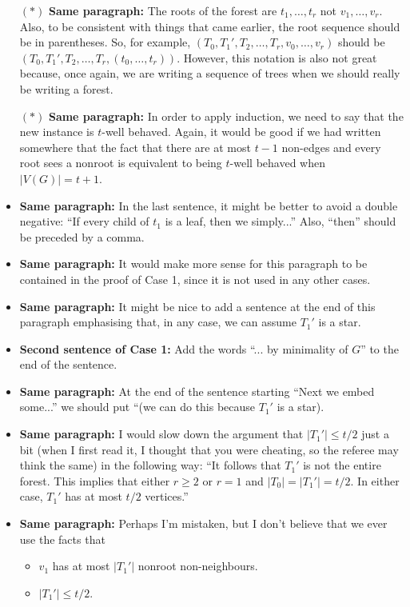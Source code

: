 \documentclass[11 pt]{article}
\begin{document}
\begin{itemize}
\item[$\boldsymbol{(*)}$] \textbf{Same paragraph:} The roots of the forest are $t_1,\dots,t_r$ not $v_1,\dots,v_r$. Also, to be consistent with things that came earlier, the root sequence should be in parentheses. So, for example, $(T_0,T_1',T_2,\dots,T_r,v_0,\dots,v_r)$ should be $(T_0,T_1',T_2,\dots,T_r,(t_0,\dots,t_r))$. However, this notation is also not great because, once again, we are writing a sequence of trees when we should really be writing a forest. 
\item[$\boldsymbol{(*)}$] \textbf{Same paragraph:} In order to apply induction, we need to say that the new instance is $t$-well behaved. Again, it would be good if we had written somewhere that the fact that there are at most $t-1$ non-edges and every root sees a nonroot is equivalent to being $t$-well behaved when $|V(G)|=t+1$. 
\item \textbf{Same paragraph:} In the last sentence, it might be better to avoid a double negative: ``If every child of $t_1$ is a leaf, then we simply...'' Also, ``then'' should be preceded by a comma. 
\item \textbf{Same paragraph:} It would make more sense for this paragraph to be contained in the proof of Case 1, since it is not used in any other cases. 
\item \textbf{Same paragraph:} It might be nice to add a sentence at the end of this paragraph emphasising that, in any case, we can assume $T_1'$ is a star.
\item \textbf{Second sentence of Case 1:} Add the words ``... by minimality of $G$'' to the end of the sentence. 
\item \textbf{Same paragraph:} At the end of the sentence starting ``Next we embed some...'' we should put ``(we can do this because $T_1'$ is a star). 
\item \textbf{Same paragraph:} I would slow down the argument that $|T_1'|\leq t/2$ just a bit (when I first read it, I thought that you were cheating, so the referee may think the same) in the following way: ``It follows that $T_1'$ is not the entire forest. This implies that either $r\geq2$ or $r=1$ and $|T_0|=|T_1'|=t/2$. In either case, $T_1'$ has at most $t/2$ vertices.''
\item \textbf{Same paragraph:} Perhaps I'm mistaken, but I don't believe that we ever use the facts that
\begin{itemize}
\item $v_1$ has at most $|T_1'|$ nonroot non-neighbours.
\item $|T_1'|\leq t/2$. 

\end{itemize}
\end{itemize}
\end{document}
